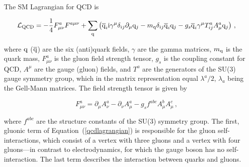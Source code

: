 The SM Lagrangian for QCD is~\cite{dissertori}
% 
\begin{linenomath*}
\begin{equation}
\label{qcdlagrangian}
\mathcal{L}_\text{QCD} =
- \frac{1}{4} F^a_{\mu\nu} F^{a\mu\nu} 
+ \sum_\mathrm{q} \left( 
    \overline{\mathrm{q}}_i \mathrm{i} \gamma^\mu \delta_{ij} \partial_\mu \mathrm{q}_j
    - m_\mathrm{q} \delta_{ij} \overline{\mathrm{q}}_i \mathrm{q}_j
    - g_s \overline{\mathrm{q}}_i \gamma^\mu T_{ij}^a A_\mu^a \mathrm{q}_j
    \right)
\,,
\end{equation}
\end{linenomath*}
% 
where $\mathrm{q}$ ($\overline{\mathrm{q}}$) are the six (anti)quark fields, $\gamma$ are the gamma matrices, $m_\mathrm{q}$ is the quark mass, $F^a_{\mu\nu}$ is the gluon field strength tensor, $g_s$ is the coupling constant for QCD, $A^\mu$ are the gauge (gluon) fields, and $T^a$ are the generators of the SU(3) gauge symmetry group, which in the matrix representation equal $\lambda^a/2$, $\lambda_a$ being the Gell-Mann matrices.
% 
The field strength tensor is given by
% 
\begin{linenomath*}
\begin{equation}
F^a_{\mu\nu}
    = \partial_\mu A^a_\nu - \partial_\nu A^a_\mu - g_s f^{abc} A_\mu^b A_\mu^c
\,,
\end{equation}
\end{linenomath*}
% 
where $f^{abc}$ are the structure constants of the SU(3) symmetry group.
% 
The first, gluonic term of Equation~(\ref{qcdlagrangian}) is responsible for the gluon self-interactions, which consist of a vertex with three gluons and a vertex with four gluons---in contrast to electrodynamics, for which the gauge boson has no self-interaction.
% 
The last term describes the interaction between quarks and gluons.


